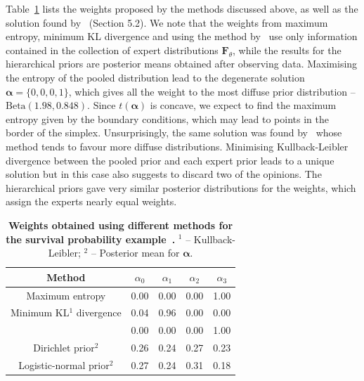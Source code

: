 \documentclass[a4paper, notitlepage, 10pt]{article}
\begin{document}
Table~\ref{tab:alphasBeta} lists the weights proposed by the methods discussed above, as well as the solution found by~\cite{Rufo2012B} (Section 5.2).
We note that the weights from maximum entropy, minimum KL divergence and using the method by~\cite{Rufo2012B} use only information contained in the collection of expert distributions $\boldsymbol F_{\theta}$, while the results for the hierarchical priors are posterior means obtained after observing data.
Maximising the entropy of the pooled distribution lead to the degenerate solution $\boldsymbol \alpha = \{0, 0, 0, 1 \}$, which gives all the weight to the most diffuse prior distribution -- $\text{Beta}(1.98, 0.848)$.
Since $t(\boldsymbol\alpha)$ is concave, we expect to find the maximum entropy given by the boundary conditions, which may lead to points in the border of the simplex.
Unsurprisingly, the same solution was found by~\cite{Rufo2012B} whose method tends to favour more diffuse distributions.
Minimising Kullback-Leibler divergence between the pooled prior and each expert prior leads to a unique solution but in this case also suggests to discard two of the opinions.
The hierarchical priors gave very similar posterior distributions for the weights, which assign the experts nearly equal weights.

\begin{table}[ht]
\caption{\textbf{Weights obtained using different methods for the survival probability example~\citep{Savchuk1994}.}
$^1$ -- Kullback-Leibler; $^2$ -- Posterior mean for $\boldsymbol\alpha$.}
\centering
\begin{tabular}{ccccc}
  \hline
Method  & $\alpha_0$ & $\alpha_1$ & $\alpha_2$ & $\alpha_3$ \\ 
  \hline
Maximum entropy & 0.00 & 0.00 & 0.00 & 1.00 \\ 
Minimum KL$^1$ divergence & 0.04 & 0.96 & 0.00 & 0.00 \\
\cite{Rufo2012A} & 0.00 & 0.00 & 0.00& 1.00\\
Dirichlet prior$^2$ & 0.26 & 0.24 & 0.27 & 0.23 \\ 
Logistic-normal prior$^2$ & 0.27 & 0.24 & 0.31 & 0.18\\
 \hline
\end{tabular}
\label{tab:alphasBeta}
\end{table}
\end{document}
